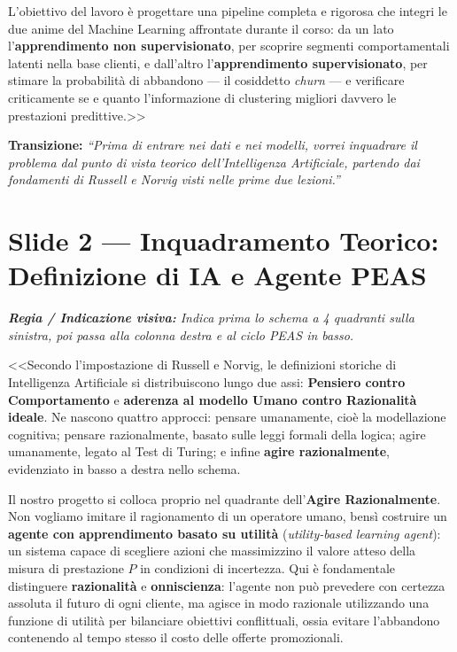 \documentclass[10pt, a4paper]{article}
\newcommand{\cue}[1]{%
  \par\vspace{2pt}\noindent\colorbox{CueBg}{\parbox{\dimexpr\linewidth-2\fboxsep}{\footnotesize\textit{\color{PrimaryNavy}\textbf{Regia / Indicazione visiva:} #1}}}\par\vspace{3pt}%
}
\newcommand{\transition}[1]{%
  \par\vspace{2pt}\noindent\colorbox{LightBg}{\parbox{\dimexpr\linewidth-2\fboxsep}{\small\textbf{\color{SecondaryBlue}Transizione:} \textit{``#1''}}}\par\vspace{4pt}%
}
\begin{document}
L'obiettivo del lavoro è progettare una pipeline completa e rigorosa che integri le due anime del Machine Learning affrontate durante il corso: da un lato l'\textbf{apprendimento non supervisionato}, per scoprire segmenti comportamentali latenti nella base clienti, e dall'altro l'\textbf{apprendimento supervisionato}, per stimare la probabilità di abbandono --- il cosiddetto \textit{churn} --- e verificare criticamente se e quanto l'informazione di clustering migliori davvero le prestazioni predittive.>>
\transition{Prima di entrare nei dati e nei modelli, vorrei inquadrare il problema dal punto di vista teorico dell'Intelligenza Artificiale, partendo dai fondamenti di Russell e Norvig visti nelle prime due lezioni.}

\section*{Slide 2 --- Inquadramento Teorico: Definizione di IA e Agente PEAS}
\cue{Indica prima lo schema a 4 quadranti sulla sinistra, poi passa alla colonna destra e al ciclo PEAS in basso.}
\noindent <<Secondo l'impostazione di Russell e Norvig, le definizioni storiche di Intelligenza Artificiale si distribuiscono lungo due assi: \textbf{Pensiero contro Comportamento} e \textbf{aderenza al modello Umano contro Razionalità ideale}. Ne nascono quattro approcci: pensare umanamente, cioè la modellazione cognitiva; pensare razionalmente, basato sulle leggi formali della logica; agire umanamente, legato al Test di Turing; e infine \textbf{agire razionalmente}, evidenziato in basso a destra nello schema.

Il nostro progetto si colloca proprio nel quadrante dell'\textbf{Agire Razionalmente}. Non vogliamo imitare il ragionamento di un operatore umano, bensì costruire un \textbf{agente con apprendimento basato su utilità} (\textit{utility-based learning agent}): un sistema capace di scegliere azioni che massimizzino il valore atteso della misura di prestazione $P$ in condizioni di incertezza. Qui è fondamentale distinguere \textbf{razionalità} e \textbf{onniscienza}: l'agente non può prevedere con certezza assoluta il futuro di ogni cliente, ma agisce in modo razionale utilizzando una funzione di utilità per bilanciare obiettivi conflittuali, ossia evitare l'abbandono contenendo al tempo stesso il costo delle offerte promozionali.
\end{document}
